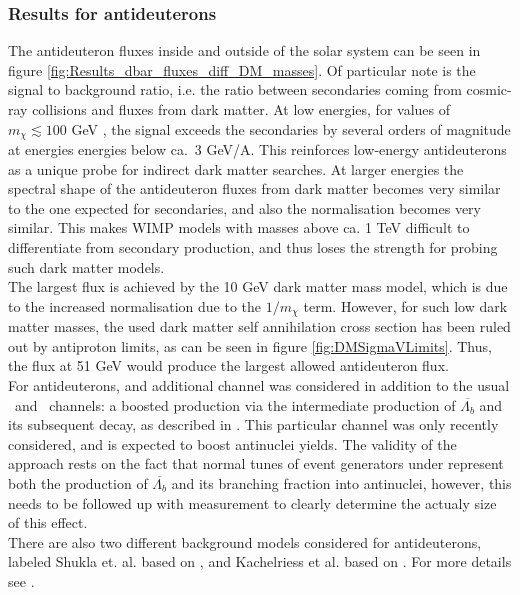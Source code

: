 \subsubsection{Results for antideuterons}
The antideuteron fluxes inside and outside of the solar system can be seen in figure \ref{fig:Results_dbar_fluxes_diff_DM_masses}. Of particular note is the signal to background ratio, i.e. the ratio between secondaries coming from cosmic-ray collisions and fluxes from dark matter. At low energies, for values of $m_\chi \lesssim 100$ GeV , the signal exceeds the secondaries by several orders of magnitude at energies energies below ca.\ 3 GeV/A. This reinforces low-energy antideuterons as a unique probe for indirect dark matter searches. At larger energies the spectral shape of the antideuteron fluxes from dark matter becomes very similar to the one expected for secondaries, and also the normalisation becomes very similar. This makes WIMP models with masses above ca. 1 TeV difficult to differentiate from secondary production, and thus loses the strength for probing such dark matter models. \\
The largest flux is achieved by the 10 GeV dark matter mass model, which is due to the increased normalisation due to the $1/m_\chi$ term. However, for such low dark matter masses, the used dark matter self annihilation cross section has been ruled out by antiproton limits, as can be seen in figure \ref{fig:DMSigmaVLimits}. Thus, the flux at 51 GeV would produce the largest allowed antideuteron flux. \\

For antideuterons, and additional channel was considered in addition to the usual \WW\ and \bb\ channels: a boosted production via the intermediate production of $\overline{\Lambda_b}$ and its subsequent decay, as described in \cite{}. This particular channel was only recently considered, and is expected to boost antinuclei yields. The validity of the approach rests on the fact that normal tunes of event generators under represent both the production of $\overline{\Lambda_b}$ and its branching fraction into antinuclei, however, this needs to be followed up with measurement to clearly determine the actualy size of this effect. \\
There are also two different background models considered for antideuterons, labeled Shukla et. al. based on \cite{}, and Kachelriess et al. based on \cite{}. For more details see \cite{}.

